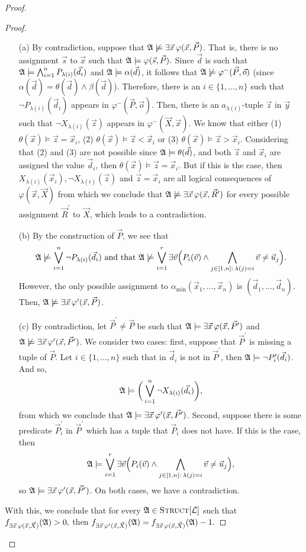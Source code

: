 \documentclass[12pt]{article}
\def\Truc{\textsc{Struct}[\L]}
\def\A{{\frak A}}
\def\L{{\cal L}}
\def\P{\vec{P}}
\def\R{\vec{R}}
\def\X{\vec{X}}
\def\d{\vec{d}} %
\def\s{\vec{s}}
\def\u{\vec{u}} %
\def\v{\vec{v}} %
\def\x{\vec{x}} %
\def\y{\vec{y}} %
\def\z{\vec{z}} %
\def\ep{\vec{o}}
\begin{document}
\begin{proof}
\begin{enumerate}
\begin{proof}
\begin{enumerate}
\item[(a)] By contradiction, suppose that $\A\not\models\exists\x\,\varphi(\x,\P)$. That is, there is no assignment $\s$ to $\x$ such that $\A\models\varphi(\s,\P).$ Since $\d$ is such that $\A\models \bigwedge_{i=1}^n P_{\lambda(i)}(\d_i)$ and $\A\models \alpha(\d)$, it follows that $\A\not\models\varphi^{-}(\P,\ep)$ (since $\alpha(\d)=\theta(\d)\wedge\beta(\d)$). Therefore, there is an $i\in\{1,\ldots,n\}$ such that $\neg P_{\lambda(i)}(\d_i)$ appears in $\varphi^{-}(\P,\ep)$. Then, there is an $a_{\lambda(i)}$-tuple $\z$ in $\y$ such that $\neg X_{\lambda(i)}(\z)$ appears in $\varphi^{-}(\X,\x)$. We know that either (1) $\theta(\x)\models \z = \x_i$, (2) $\theta(\x)\models \z < \x_i$ or (3) $\theta(\x)\models \z > \x_i$. Considering that (2) and (3) are not possible since $\A\models\theta(\d)$, and both $\z$ and $\x_i$ are assigned the value $\d_i$, then $\theta(\x)\models \z = \x_i$. But if this is the case, then $X_{\lambda(i)}(\x_i), \neg X_{\lambda(i)}(\z)$ and $\z = \x_i$ are all logical consequences of $\varphi(\x,\X)$ from which we conclude that $\A\not\models\exists\x\,\varphi(\x,\R^\prime)$ for every possible assignment $\R^\prime$ to $\X$, which leads to a contradiction.
\item[(b)] By the construction of $\P$, we see that 
$$\A\not\models\bigvee_{i = 1}^{n}\neg P_{\lambda(i)}(\d_i) \text{ and that } \A\not\models\bigvee_{i=1}^r \exists \v\Big( P_i(\v) \wedge \bigwedge_{j\in[1,n]:\: \lambda(j) = i} \v \neq \u_j\Big).$$ However, the only possible assignment to $\alpha_{\min}(\x_1,\dots,\x_n)$ is $(\d_1,\dots,\d_n)$. Then, $\A\not\models\exists\x\,\varphi^\prime(\x,\P)$.
\item[(c)] By contradiction, let $\P^\prime \neq \P$ be such that $\A\models\exists\x\,\varphi(\x,\P^\prime)$ and $\A\not\models\exists\x\,\varphi^\prime(\x,\P^\prime)$. We consider two cases: first, suppose that $\P^\prime$ is missing a tuple of $\P$. Let $i\in\{1,\ldots,n\}$ such that in $\d_i$ is not in $\P^\prime$, then $\A\models \neg P^\prime_i(\d_i)$. And so,$$\A\models \bigg(\bigvee_{i = 1}^{n}\neg X_{\lambda(i)}(\d_i) \bigg), $$ from which we conclude that $\A\models\exists\x\,\varphi^\prime(\x,\P^\prime)$. Second, suppose there is some predicate $\P^\prime_i$ in $\P^\prime$ which has a tuple that $\P_i$ does not have. If this is the case, then $$\A\models\bigvee_{i=1}^r \exists \v\Big( P_i(\v) \wedge \bigwedge_{j\in[1,n]:\: \lambda(j) = i} \v \neq \u_j\Big),$$ so $\A\models\exists\x\,\varphi^\prime(\x,\P^\prime)$. On both cases, we have a contradiction.
\end{enumerate}
With this, we conclude that for every $\A\in\Truc$ such that $f_{\exists\x\,\varphi(\x,\X)}(\A)>0,$ then $f_{\exists\x\,\varphi^\prime(\x,\X)}(\A) = f_{\exists\x\,\varphi(\x,\X)}(\A)-1.$


\end{proof}
\end{enumerate}
\end{proof}
\end{document}
